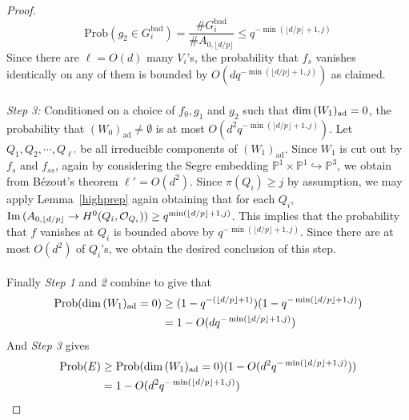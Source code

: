 \documentclass[12pt]{article}
\theoremstyle{plain}
\theoremstyle{definition}
\newcommand{\IP}{\mathbb{P}}
\newcommand{\sO}{\mathcal{O}}
\renewcommand\dim{{\rm dim\,}}
\newcommand{\im}{{\rm Im\,}}
\newcommand{\<}{\langle}
\renewcommand{\>}{\rangle}
\newcommand{\into}{\hookrightarrow}
\newcommand{\Prob}{\mathrm{Prob}}
\newcommand{\ad}{\mathrm{ad}}
\begin{document}
\begin{proof}
$$\Prob(g_2 \in G^{\mathrm{bad}}_i) = \frac{\# G^{\mathrm{bad}}_i}{\# A_{0, \lfloor d/p \rfloor}} \le q^{- \min(\lfloor d/p \rfloor + 1, j)}$$
Since there are $\ell = O(d)$ many $V_i$'s, the probability that $f_s$ vanishes identically on any of them is bounded by $O(d q^{- \min(\lfloor d/p \rfloor + 1, j)})$ as claimed. \\\\
\textit{Step 3: }Conditioned on a choice of $f_0, g_1$ and $g_2$ such that $\dim (W_1)_{\mathrm{ad}} = 0$, the probability that $(W_0)_{\mathrm{ad}} \neq \emptyset$ is at most $O(d^2 q^{- \min(\lfloor d/p \rfloor + 1, j)})$. Let $Q_1, Q_2, \cdots, Q_{\ell'}$ be all irreducible components of $(W_1)_{\mathrm{ad}}$. Since $W_1$ is cut out by $f_{s}$ and $f_{ss}$, again by considering the Segre embedding $\IP^1 \times \IP^1 \into \IP^3$, we obtain from B{\'e}zout's theorem $\ell' = O(d^2)$. Since $\pi(Q_i) \ge j$ by assumption, we may apply Lemma~\ref{highprep} again obtaining that for each $Q_i$, $\im(A_{0, \lfloor d/p \rfloor} \to H^0(Q_i, \sO_{Q_i})) \ge q^{\min(\lfloor d/p \rfloor + 1, j)}$. This implies that the probability that $f$ vanishes at $Q_i$ is bounded above by $q^{- \min(\lfloor d/p \rfloor + 1, j)}$. Since there are at most $O(d^2)$ of $Q_i$'s, we obtain the desired conclusion of this step.    \\\\
Finally \textit{Step 1} and \textit{2} combine to give that 
\begin{align*} \Prob(\dim (W_1)_{\ad} = 0) &\ge (1 - q^{- (\lfloor d/p \rfloor + 1)})(1- q^{- \min(\lfloor d/p \rfloor + 1, j)}) \\ &= 1 - O(d q^{- \min(\lfloor d/p \rfloor + 1, j)}) \end{align*}
And \textit{Step 3} gives 
\begin{align*}
\Prob(E) &\ge \Prob(\dim (W_1)_{\ad} = 0)(1 - O(d^2 q^{- \min(\lfloor d/p \rfloor + 1, j)})) \\
&= 1 - O(d^2 q^{- \min(\lfloor d/p \rfloor + 1, j)}) 
\end{align*} 


\end{proof}
\end{document}
